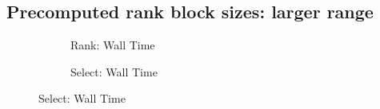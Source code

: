 \begin{appendices}


\section{Precomputed rank block sizes: larger range}
\begin{figure}[h!]\tiny
\begin{subfigure}{0.48\textwidth}
	
	\caption{Rank: Wall Time}
	\label{fig:PrecomputedRankBlockSize_Rank_WallTime}
\end{subfigure}
\hfill
\begin{subfigure}{0.48\textwidth}
	
	\caption{Select: Wall Time}
	\label{fig:PrecomputedRankBlockSize_Select_WallTime}
\end{subfigure}
\end{figure}

\end{appendices}
\restoregeometry